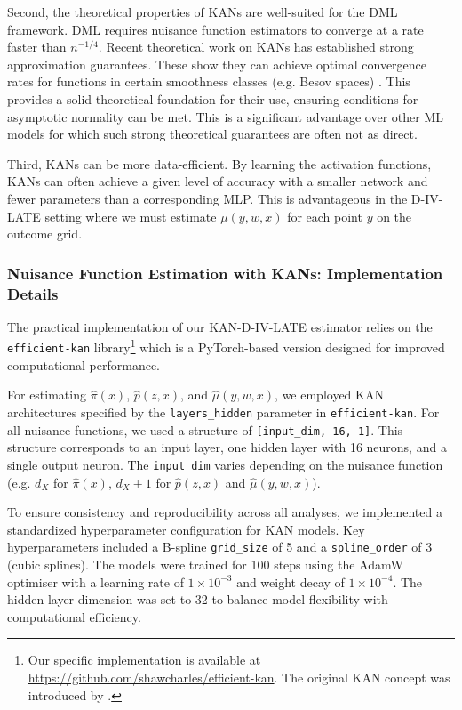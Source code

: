 \documentclass[final,3p,fleqn, 10pt]{elsarticle}
\begin{document}
Second, the theoretical properties of KANs are well-suited for the DML framework. DML requires nuisance function estimators to converge at a rate faster than $n^{-1/4}$. Recent theoretical work on KANs has established strong approximation guarantees. These show they can achieve optimal convergence rates for functions in certain smoothness classes (e.g. Besov spaces) \citep{kratsios2025kolmogorov}. This provides a solid theoretical foundation for their use, ensuring conditions for asymptotic normality can be met. This is a significant advantage over other ML models for which such strong theoretical guarantees are often not as direct.

Third, KANs can be more data-efficient. By learning the activation functions, KANs can often achieve a given level of accuracy with a smaller network and fewer parameters than a corresponding MLP. This is advantageous in the D-IV-LATE setting where we must estimate $\mu(y, w, x)$ for each point $y$ on the outcome grid.

\subsubsection{Nuisance Function Estimation with KANs: Implementation Details}
\label{subsubsec:kans_implementation}
The practical implementation of our KAN-D-IV-LATE estimator relies on the \texttt{efficient-kan} library\footnote{Our specific implementation is available at \url{https://github.com/shawcharles/efficient-kan}. The original KAN concept was introduced by \citet{liu2024kan}.} which is a PyTorch-based version designed for improved computational performance.

For estimating $\hat{\pi}(x)$, $\hat{p}(z,x)$, and $\hat{\mu}(y,w,x)$, we employed KAN architectures specified by the \texttt{layers\_hidden} parameter in \texttt{efficient-kan}. For all nuisance functions, we used a structure of \texttt{[input\_dim, 16, 1]}. This structure corresponds to an input layer, one hidden layer with 16 neurons, and a single output neuron. The \texttt{input\_dim} varies depending on the nuisance function (e.g. $d_X$ for $\hat{\pi}(x)$, $d_X+1$ for $\hat{p}(z,x)$ and $\hat{\mu}(y,w,x)$).

To ensure consistency and reproducibility across all analyses, we implemented a standardized hyperparameter configuration for KAN models. Key hyperparameters included a B-spline \texttt{grid\_size} of 5 and a \texttt{spline\_order} of 3 (cubic splines). The models were trained for 100 steps using the AdamW optimiser with a learning rate of $1 \times 10^{-3}$ and weight decay of $1 \times 10^{-4}$. The hidden layer dimension was set to 32 to balance model flexibility with computational efficiency.
\end{document}
